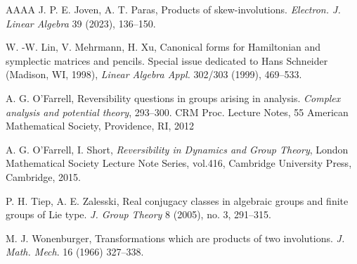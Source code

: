 \documentclass[11pt,reqno]{amsart}
\numberwithin{equation}{section}
\theoremstyle{definition}
\begin{document}
\begin{thebibliography}{AAAA}
 J. P.  E. Joven, A. T.  Paras,   Products of skew-involutions. \textit{Electron. J. Linear Algebra} 39 (2023), 136--150.
	
  W. -W. Lin, V. Mehrmann,   H. Xu, Canonical forms for Hamiltonian and symplectic matrices and pencils. Special issue dedicated to Hans Schneider (Madison, WI, 1998), \textit{Linear Algebra Appl.} 302/303 (1999), 469--533.
	
	
 A. G. O'Farrell,  Reversibility questions in groups arising in analysis. \textit{Complex analysis and potential theory}, 293--300. CRM Proc. Lecture Notes, 55
American Mathematical Society, Providence, RI, 2012
	
	
	
 A.  G. O’Farrell,   I.  Short, {\it Reversibility in Dynamics and Group Theory}, London Mathematical Society Lecture Note Series, vol.416, Cambridge University Press, Cambridge, 2015.
	
 P. H. 	Tiep, A. E.  Zalesski,  Real conjugacy classes in algebraic groups and finite groups of Lie type.  \textit{J. Group Theory} 8 (2005), no. 3, 291--315.
	
 M.  J. Wonenburger, Transformations which are products of two involutions. {\it J. Math. Mech}. 16 (1966) 327--338.
	
\end{thebibliography}
\end{document}

